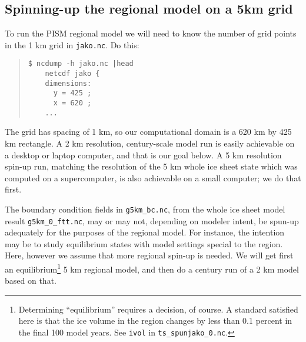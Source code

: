 \subsection*{Spinning-up the regional model on a 5km grid}
To run the PISM regional model we will need to know the number of grid points in the 1 km grid in \verb|jako.nc|.  Do this:
\begin{quote}\small
\begin{verbatim}
$ ncdump -h jako.nc |head
    netcdf jako {
    dimensions:
      y = 425 ;
      x = 620 ;
    ...
\end{verbatim}
\normalsize\end{quote}
The grid has spacing of 1 km, so our computational domain is a 620 km by 425 km rectangle.  A 2 km resolution, century-scale model run is easily achievable on a desktop or laptop computer, and that is our goal below.  A 5 km resolution spin-up run, matching the resolution of the 5 km whole ice sheet state which was computed on a supercomputer, is also achievable on a small computer; we do that first.

The boundary condition fields in \verb|g5km_bc.nc|, from the whole ice sheet model result  \verb|g5km_0_ftt.nc|, may or may not, depending on modeler intent, be spun-up adequately for the purposes of the regional model.  For instance, the intention may be to study equilibrium states with model settings special to the region.  Here, however we assume that more regional spin-up is needed.  We will get first an equilibrium\footnote{Determining ``equilibrium'' requires a decision, of course.  A standard satisfied here is that the ice volume in the region changes by less than 0.1 percent in the final 100 model years.  See \texttt{ivol} in \texttt{ts_spunjako_0.nc}.} 5 km regional model, and then do a century run of a 2 km model based on that.


